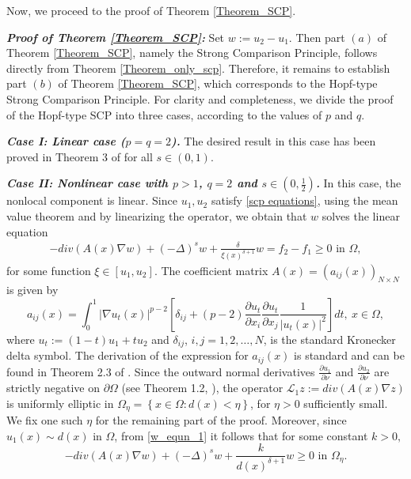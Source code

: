 \documentclass[reqno,oneside]{amsart}
\theoremstyle{definition}
\theoremstyle{remark}
\numberwithin{equation}{section}
\newcommand{\Om} {\Omega}
\newcommand{\s}{(-\Delta)^s}
\newcommand{\pa}{\partial}
\newcommand{\na} {\nabla}
\begin{document}
Now, we proceed to the proof of Theorem \ref{Theorem_SCP}.
\vspace{5pt}

\noindent\textbf{\textit{Proof of Theorem \ref{Theorem_SCP}:}} Set \( w := u_2 - u_1 \). Then part $(a)$ of Theorem \ref{Theorem_SCP}, namely the Strong Comparison Principle, follows directly from Theorem \ref{Theorem_only_scp}. Therefore, it remains to establish part $(b)$ of Theorem \ref{Theorem_SCP}, which corresponds to the Hopf-type Strong Comparison Principle. For clarity and completeness, we divide the proof of the Hopf-type SCP into three cases, according to the values of $p$ and $q$.
\vspace{5pt}

\noindent\textbf{\textit{Case I: Linear case ($p=q=2$).}} The desired result in this case has been proved in Theorem 3 of \cite{pramanik2024mixed} for all $s\in (0,1)$.
\vspace{5pt}

\noindent\textit{\textbf{Case II: Nonlinear case with $p>1$, $q=2$ and $s\in \left( 0, \frac{1}{2} \right)$.}} In this case, the nonlocal component is linear. Since $u_1, u_2$ satisfy \eqref{scp equations}, using the mean value theorem and by linearizing the operator, we obtain that $w$ solves the linear equation
\begin{equation}\label{w_equn_1}
    \begin{aligned}
        -div \left(A(x)\na w \right) + \s w + \frac{\delta}{\xi (x)^{\delta +1}} w = f_2 - f_1 \geq 0 \text{ in } \Om,
    \end{aligned}
\end{equation}
for some function $\xi \in [u_1, u_2]$. The coefficient matrix $A(x) = \left(a_{ij} (x)\right)_{N\times N}$ is given by
\[ a_{ij} (x) = \int_0^1 |\na u_t (x)|^{p-2} \left[ \delta_{ij} + (p-2) \frac{\pa u_t}{\pa x_i} \frac{\pa u_t}{\pa x_j} \frac{1}{|u_t (x)|^2} \right] dt,\ x\in \Om, \]
where $u_t := (1-t) u_1 + t u_2$ and $\delta_{ij}$, $i,j = 1,2, \dots, N$, is the standard Kronecker delta symbol. The derivation of the expression for $a_{ij}(x)$ is standard and can be found in Theorem 2.3 of \cite{giacomoni2007sobolev}.  {Since the outward normal derivatives $\frac{\pa u_1}{\pa\nu}$ and $ \frac{\pa u_2}{\pa\nu}$ are strictly negative on $\pa\Om$ (see Theorem 1.2, \cite{antonini2023global}),} the operator $\mathcal{L}_1 z:= div \left(A(x)\na z \right)$ is uniformly elliptic in $\Om_{\eta} = \left\{ x\in \Om: d(x) < \eta \right\}$, for $\eta >0$ sufficiently small. We fix one such  $\eta$ for the remaining part of the proof. Moreover, since $u_1 (x) \sim d(x)$ in $\Om$, from \eqref{w_equn_1} it follows that for some constant $k>0,$
\begin{equation}\label{w_equn_2}
    -div \left(A(x)\na w \right) + \s w + \frac{k}{d(x)^{\delta +1}} w \geq 0 \text{ in } \Om_{\eta}.
\end{equation}
\end{document}
